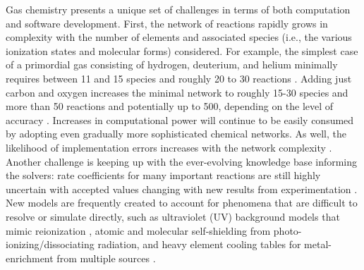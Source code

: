 Gas chemistry presents a unique set of challenges in terms of
both computation and software development.  First, the network of
reactions rapidly grows in complexity with the number of elements and
associated species (i.e., the various ionization states and
molecular forms) considered.  For example, the simplest case of a
primordial gas consisting of hydrogen, deuterium, and helium minimally
requires between 11 and 15 species and roughly 20 to 30 reactions
\citep{1997NewA....2..181A, 1998A&A...335..403G}.
Adding just carbon and oxygen increases the minimal network to 
roughly 15-30 species and more than 50 reactions
and potentially up to 500, depending on the level of
accuracy \citep{2005ApJ...626..627O, 2012MNRAS.421..116G}.  Increases in
computational power will continue to be easily consumed by adopting
even gradually more sophisticated chemical networks.  As well,
the likelihood of implementation
errors increases with the network complexity
\citep{taschuk2017ten}. Another challenge is keeping up with
the ever-evolving knowledge base informing the solvers: rate
coefficients for many important reactions are still highly uncertain
\citep{2008MNRAS.388.1627G, 2011ApJ...726...55T} with accepted values
changing with new results from experimentation
\citep{2010Sci...329...69K, 2015ApJS..219....6O, 2016ApJ...816...31D}.
New models are frequently created to account for
phenomena that are difficult to resolve or simulate directly, such as
ultraviolet (UV) background models that mimic reionization
\citep[e.g.,][]{1996ApJ...461...20H, 2001cghr.confE..64H,
2012ApJ...746..125H, 2009ApJ...703.1416F}, atomic
\citep{2013MNRAS.430.2427R} and molecular \citep{1996ApJ...468..269D,
2012MNRAS.425L..51W} self-shielding from photo-ionizing/dissociating
radiation, and heavy element cooling tables for metal-enrichment from
multiple sources \citep[e.g.,][]{2009MNRAS.393...99W,
2013MNRAS.433.3005D}.


